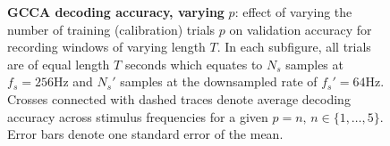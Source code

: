 \begin{figure}[htp]
\hfill
{}

\caption[GCCA decoding accuracy, varying $p$: effect of varying the number of training (calibration) trials $p$ on validation accuracy for recording windows of varying length $T$.]{\textbf{GCCA decoding accuracy, varying }$p$: effect of varying the number of training (calibration) trials $p$ on validation accuracy for recording windows of varying length $T$. In each subfigure, all trials are of equal length $T$ seconds which equates to $N_s$ samples at $f_s=256$Hz and $N_s'$ samples at the downsampled rate of $f_s'=64$Hz. Crosses connected with dashed traces denote average decoding accuracy across stimulus frequencies for a given $p=n, \, n\in\{1, \dots, 5\}$. Error bars denote one standard error of the mean.}
\label{fig:gcca-acc-nt}
\end{figure}


